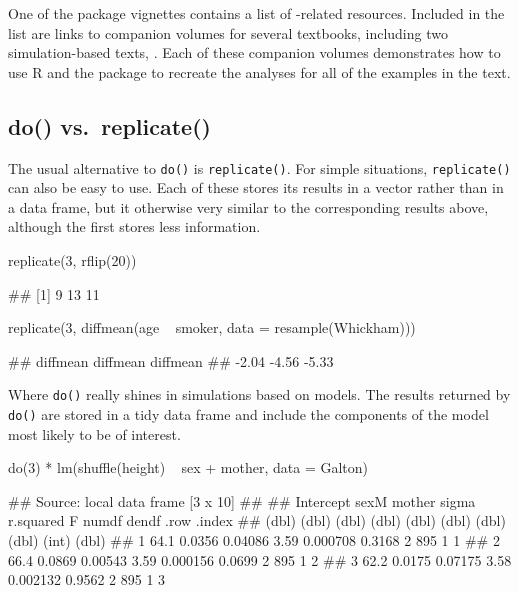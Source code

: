 One of the package vignettes \citep{mosaic-resources:2016} contains a
list of -related resources. Included in the list are links
to companion volumes for several textbooks, including two
simulation-based texts, \citep{Lock5,Tintle:2016}. Each of these
companion volumes demonstrates how to use R and the  package
to recreate the analyses for all of the examples in the text.

\subsection{do() vs.~replicate()}\label{do-vs.replicate}

The usual alternative to \texttt{do()} is \texttt{replicate()}. For
simple situations, \texttt{replicate()} can also be easy to use. Each of
these stores its results in a vector rather than in a data frame, but it
otherwise very similar to the corresponding results above, although the
first stores less information.

\begin{Schunk}
\begin{Sinput}
replicate(3, rflip(20)) 
\end{Sinput}
\begin{Soutput}
## [1]  9 13 11
\end{Soutput}
\begin{Sinput}
replicate(3, diffmean(age ~ smoker, data = resample(Whickham)))
\end{Sinput}
\begin{Soutput}
## diffmean diffmean diffmean 
##    -2.04    -4.56    -5.33
\end{Soutput}
\end{Schunk}

Where \texttt{do()} really shines in simulations based on models. The
results returned by \texttt{do()} are stored in a tidy data frame and
include the components of the model most likely to be of interest.

\begin{Schunk}
\begin{Sinput}
do(3) * lm(shuffle(height) ~ sex + mother, data = Galton)
\end{Sinput}
\begin{Soutput}
## Source: local data frame [3 x 10]
## 
##   Intercept   sexM  mother sigma r.squared      F numdf dendf  .row .index
##       (dbl)  (dbl)   (dbl) (dbl)     (dbl)  (dbl) (dbl) (dbl) (int)  (dbl)
## 1      64.1 0.0356 0.04086  3.59  0.000708 0.3168     2   895     1      1
## 2      66.4 0.0869 0.00543  3.59  0.000156 0.0699     2   895     1      2
## 3      62.2 0.0175 0.07175  3.58  0.002132 0.9562     2   895     1      3
\end{Soutput}
\end{Schunk}

